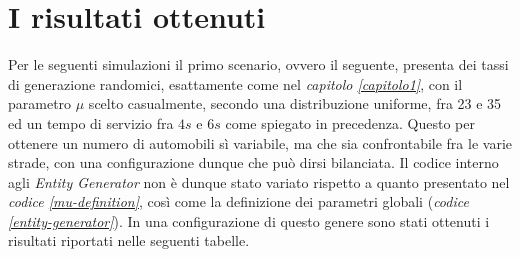 \newpage
\section{I risultati ottenuti}
Per le seguenti simulazioni il primo scenario, ovvero il seguente, presenta dei tassi di generazione randomici, esattamente come nel \textit{capitolo \ref{capitolo1}}, con il parametro $\mu$ scelto casualmente, secondo una distribuzione uniforme, fra 23 e 35 ed un tempo di servizio fra $4s$ e $6s$ come spiegato in precedenza. Questo per ottenere un numero di automobili sì variabile, ma che sia confrontabile fra le varie strade, con una configurazione dunque che può dirsi bilanciata. Il codice interno agli \textit{Entity Generator} non è dunque stato variato rispetto a quanto presentato nel \textit{codice \ref{mu-definition}}, così come la definizione dei parametri globali (\textit{codice \ref{entity-generator}}). In una configurazione di questo genere sono stati ottenuti i risultati riportati nelle seguenti tabelle.
\newline

